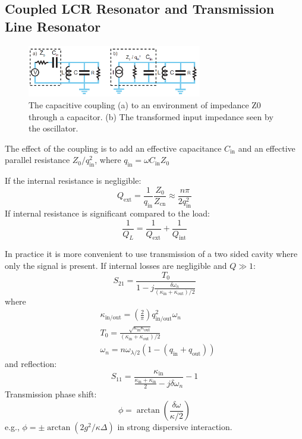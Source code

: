 \documentclass[8pt,a4paper,twocolumn]{article} %
\numberwithin{equation}{section} %
\begin{document}
		\subsection{Coupled LCR Resonator and Transmission Line Resonator} %
		\label{sub:coupled_lcr_resonator}
			\begin{figure}[!h]
				\centering
				\includegraphics[width=3in]{coupledLCR.png}
				\caption{The capacitive coupling (a) to an environment of impedance Z0 through a capacitor. (b) The transformed input impedance seen by the oscillator. \cite{Schuster2007}}
				\label{pic:coupledLCR}
			\end{figure}
			The effect of the coupling is to add an effective capacitance $ C_{\text{in}} $ and an effective parallel resistance $ Z_0/q_{\text{in}}^2 $, where $ q_{\text{in}}=\omega C_{\text{in}} Z_0 $

			If the internal resistance is negligible:
			\begin{equation}
				Q_{\text{ext}}=\frac{1}{q_{\text{in}}}\frac{Z_0}{Z_{\text{cn}}}\approx \frac{n \pi}{2q_{\text{in}}^2}
			\end{equation}
			If internal resistance is significant compared to the load:
			\begin{equation}
				\frac{1}{Q_L}=\frac{1}{Q_{\text{ext}}}+\frac{1}{Q_{\text{int}}}
			\end{equation}

			In practice it is more convenient to use transmission of a two sided cavity where only the signal is present. If internal losses are negligible and $ Q\gg 1 $:
			\begin{equation}
				S_{21}=\frac{T_0}{1-j \frac{\delta \omega_n}{(\kappa_{\text{in}}+\kappa_{\text{out}})/2}}
			\end{equation}
			where
			\begin{align}
				&\kappa_{\text{in/out}}=\left( \frac{2}{\pi}  \right)q_{\text{in/out}}^2 \omega_n\\
				&T_0 = \frac{\sqrt{\kappa_{\text{in}}\kappa_{\text{out}}}}{(\kappa_{\text{in}}+\kappa_{\text{out}})/2}\\
				&\omega_n = n \omega_{\lambda/2} (1- (q_{\text{in}}+q_{\text{out}}))
			\end{align}
			and reflection:
			\begin{equation}
				S_{11}=\frac{\kappa_{\text{in}}}{\frac{\kappa_{\text{in}}+\kappa_{\text{in}}}{2}-j \delta \omega_n}-1
			\end{equation}
			Transmission phase shift:
			\begin{equation}
				\phi=\arctan\left( \frac{\delta \omega}{\kappa/2} \right)
			\end{equation}
			e.g., $ \phi=\pm\arctan\left( 2g^2/\kappa \Delta \right) $ in strong dispersive interaction\cite{SchusterEtal2005}.
\end{document}
